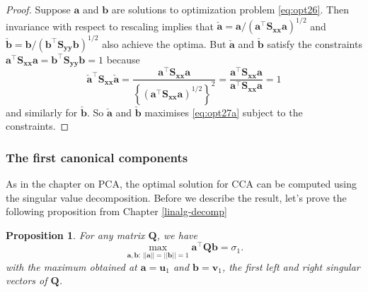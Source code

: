 \documentclass[]{book}
\newtheorem{proposition}{Proposition}[chapter]
\theoremstyle{definition}
\theoremstyle{definition}
\theoremstyle{definition}
\theoremstyle{remark}
\begin{document}
\begin{proof}
{}
Suppose \({\boldsymbol a}\) and \({\boldsymbol b}\) are solutions to optimization problem \eqref{eq:opt26}. Then invariance with respect to rescaling implies that \(\check{\boldsymbol a}={\boldsymbol a}/({\boldsymbol a}^\top \boldsymbol S_{\boldsymbol x\boldsymbol x} {\boldsymbol a})^{1/2}\) and \(\check{\boldsymbol b}= {\boldsymbol b}/({\boldsymbol b}^\top \boldsymbol S_{\boldsymbol y\boldsymbol y} {\boldsymbol b})^{1/2}\) also achieve the optima.
But \(\check{\boldsymbol a}\) and \(\check{\boldsymbol b}\) satisfy the constraints \(\boldsymbol a^\top \boldsymbol S_{\boldsymbol x\boldsymbol x}\boldsymbol a=\boldsymbol b^\top \boldsymbol S_{\boldsymbol y\boldsymbol y}\boldsymbol b=1\)
because
\[
\check{\boldsymbol a}^\top \boldsymbol S_{\boldsymbol x\boldsymbol x} \check{\boldsymbol a}=\frac{{\boldsymbol a}^\top \boldsymbol S_{\boldsymbol x\boldsymbol x}{\boldsymbol a}}{\left \{ \left ({\boldsymbol a}^\top \boldsymbol S_{\boldsymbol x\boldsymbol x}{\boldsymbol a}\right )^{1/2}\right \}^2}
=\frac{{\boldsymbol a}^\top \boldsymbol S_{\boldsymbol x\boldsymbol x}{\boldsymbol a}}{{\boldsymbol a}^\top \boldsymbol S_{\boldsymbol x\boldsymbol x}{\boldsymbol a}}=1
\]
and similarly for \(\check{\boldsymbol b}\).
So \(\check{\boldsymbol a}\) and \(\check{\boldsymbol b}\) maximises \eqref{eq:opt27a} subject to the constraints.
\end{proof}

\hypertarget{the-first-canonical-components}{%
\subsubsection*{The first canonical components}\label{the-first-canonical-components}}

As in the chapter on PCA, the optimal solution for CCA can be computed using the singular value decomposition. Before we describe the result, let's prove the following proposition from Chapter \ref{linalg-decomp}

\begin{proposition}
\protect\hypertarget{prp:svdmax2}{}{\label{prp:svdmax2} }For any matrix \(\boldsymbol Q\), we have
\[
\max_{\boldsymbol a, \boldsymbol b:\, \vert \vert \boldsymbol a\vert \vert=\vert \vert \boldsymbol b\vert \vert =1} \boldsymbol a^\top \boldsymbol Q\boldsymbol b=\sigma_1.
\]
with the maximum obtained at \(\boldsymbol a=\boldsymbol u_1\) and \(\boldsymbol b=\boldsymbol v_1\), the first left and right singular vectors of \(\boldsymbol Q\).
\end{proposition}
\end{document}

